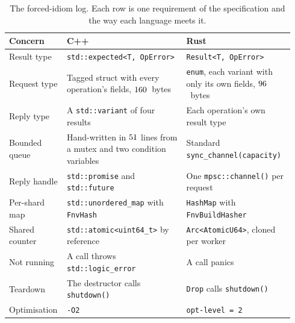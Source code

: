 \documentclass[english,oneside,a4paper,censored,csm,software-track-2020]{HYthesisML}
\begin{document}
\enlargethispage{20pt}
\begin{table}[!ht]
\centering
\small
\caption[The forced-idiom log]{The forced-idiom log. Each row is one requirement
of the specification and the way each language meets it.\label{tab:idioms}}
\footnotesize
\renewcommand{\arraystretch}{0.95}
\begin{tabular}{@{}R{0.16\linewidth} R{0.41\linewidth} R{0.37\linewidth}@{}}
\hline\hline
Concern & C++ & Rust \\
\hline
Result type & \texttt{std::expected<T, OpError>} & \texttt{Result<T, OpError>} \\
Request type & Tagged struct with every operation's fields, $160$~bytes & \texttt{enum}, each variant with only its own fields, $96$~bytes \\
Reply type & A \texttt{std::variant} of four results & Each operation's own result type \\
Bounded queue & Hand-written in $51$ lines from a mutex and two condition variables & Standard \texttt{sync\_channel(capacity)} \\
Reply handle & \texttt{std::promise} and \texttt{std::future} & One \texttt{mpsc::channel()} per request \\
Per-shard map & \texttt{std::unordered\_map} with \texttt{FnvHash} & \texttt{HashMap} with \texttt{FnvBuildHasher} \\
Shared counter & \texttt{std::atomic<uint64\_t>} by reference & \texttt{Arc<AtomicU64>}, cloned per worker \\
Not running & A call throws \texttt{std::logic\_error} & A call panics \\
Teardown & The destructor calls \texttt{shutdown()} & \texttt{Drop} calls \texttt{shutdown()} \\
Optimisation & \texttt{-O2} & \texttt{opt-level = 2} \\
\hline
\end{tabular}
\end{table}
\end{document}
